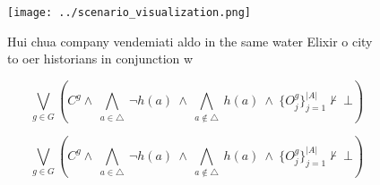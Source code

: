 \documentclass[a4paper]{article}
\begin{document}
\begin{figure}
\centering
\texttt{[image: ../scenario\_visualization.png]}
\caption{Hui chua company vendemiati aldo in the same water Elixir o city to oer historians in conjunction w
}
\end{figure}
 
\[\bigvee_{g\in G} (C^g \wedge\ \bigwedge_{a\in \triangle}\ \neg h(a)\ \wedge\ \bigwedge_{a\notin \triangle}\ h(a)\ \wedge\ \{O_j^g\}_{j=1}^{|A|} \nvdash\ \bot )\]

\[\bigvee_{g\in G} (C^g \wedge\ \bigwedge_{a\in \triangle}\ \neg h(a)\ \wedge\ \bigwedge_{a\notin \triangle}\ h(a)\ \wedge\ \{O_j^g\}_{j=1}^{|A|} \nvdash\ \bot )\]
\end{document}

